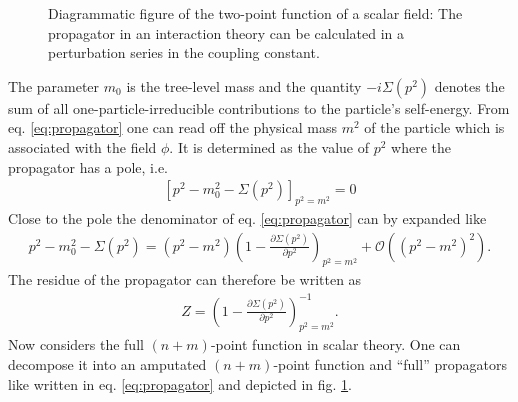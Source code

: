 \begin{figure}[!htbp]
\begin{center}
\caption{Diagrammatic figure of the two-point function of a scalar field: The propagator in an interaction theory can be calculated in a perturbation series in the coupling constant.}\label{fig:fullpropagator}
\end{center}
\end{figure}
The parameter $m_0$ is the tree-level mass and the quantity $-i \Sigma(p^2)$ denotes the sum of all one-particle-irreducible contributions to the particle's self-energy. From eq. \eqref{eq:propagator} one can read off the physical mass $m^2$ of the particle which is associated with the field $\phi$. It is determined as the value of $p^2$ where the propagator has a pole, i.e. 
\begin{align}
\left[ p^2 - m_0^2 - \Sigma(p^2)\right]_{p^2 = m^2} = 0
\end{align}
Close to the pole the denominator of eq. \eqref{eq:propagator} can by expanded like
\begin{align}
p^2 - m_0^2 - \Sigma(p^2) = (p^2 - m^2)\left( 1 - \frac{\partial \Sigma(p^2)}{\partial p^2} \right)_{p^2 = m^2} + \mathcal{O}((p^2 - m^2)^2).
\end{align}
The residue of the propagator can therefore be written as 
\begin{align}
Z = \left( 1 - \frac{\partial \Sigma(p^2)}{\partial p^2} \right)_{p^2 = m^2}^{-1}.
\end{align}
Now considers the full $(n+m)$-point function in scalar theory. One can decompose it into an amputated $(n+m)$-point function and ``full'' propagators like written in eq. \eqref{eq:propagator} and depicted in fig. \ref{fig:fullpropagator}.
